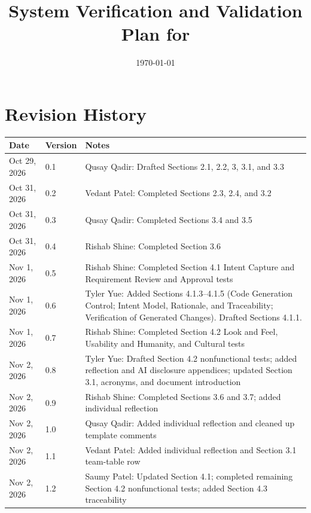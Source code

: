 \documentclass[12pt, titlepage]{article}
\begin{document}
\title{System Verification and Validation Plan for \progname{}} 
\author{\authname}
\date{\today}
	
\maketitle


\section*{Revision History}

\begin{longtable}{p{2.6cm}p{1.7cm}p{\dimexpr\textwidth-4.3cm-6\tabcolsep\relax}}
\toprule {\bf Date} & {\bf Version} & {\bf Notes}\\
\midrule
\endhead
Oct 29, 2026 & 0.1 & Qusay Qadir: Drafted Sections 2.1, 2.2, 3, 3.1, and 3.3\\
Oct 31, 2026 & 0.2 & Vedant Patel: Completed Sections 2.3, 2.4, and 3.2\\
Oct 31, 2026 & 0.3 & Qusay Qadir: Completed Sections 3.4 and 3.5\\
Oct 31, 2026 & 0.4 & Rishab Shine: Completed Section 3.6\\
Nov 1, 2026 & 0.5 & Rishab Shine: Completed Section 4.1 Intent Capture and
Requirement Review and Approval tests\\
Nov 1, 2026 & 0.6 & Tyler Yue: Added Sections 4.1.3--4.1.5 (Code Generation
Control; Intent Model, Rationale, and Traceability; Verification of Generated
Changes). Drafted Sections 4.1.1. \\
Nov 1, 2026 & 0.7 & Rishab Shine: Completed Section 4.2 Look and Feel,
Usability and Humanity, and Cultural tests\\
Nov 2, 2026 & 0.8 & Tyler Yue: Drafted Section 4.2 nonfunctional tests; added
reflection and AI disclosure appendices; updated Section 3.1, acronyms, and
document introduction\\
Nov 2, 2026 & 0.9 & Rishab Shine: Completed Sections 3.6 and 3.7; added
individual reflection\\
Nov 2, 2026 & 1.0 & Qusay Qadir: Added individual reflection and cleaned up
template comments\\
Nov 2, 2026 & 1.1 & Vedant Patel: Added individual reflection and Section 3.1
team-table row\\
Nov 2, 2026 & 1.2 & Saumy Patel: Updated Section 4.1; completed remaining
Section 4.2 nonfunctional tests; added Section 4.3 traceability\\

\end{longtable}
\end{document}
